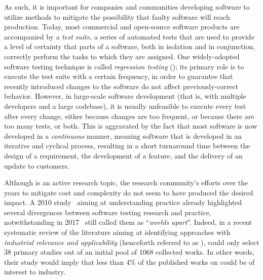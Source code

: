 As such, it is important for companies and communities developing software to utilize methods to mitigate the possibility that faulty software will reach production.
Today, most commercial and open-source software products are accompanied by a \textit{test suite}, a series of automated tests that are used to provide a level of certainty that parts of a software, both in isolation and in conjunction, correctly perform the tasks to which they are assigned.
One widely-adopted software testing technique is called \textit{regression testing} (\rt); its primary role is to execute the test suite with a certain frequency, in order to guarantee that recently introduced changes to the software do not affect previously-correct behavior.
However, in large-scale software development (that is, with multiple developers and a large codebase), it is usually unfeasible to execute every test after every change, either because changes are too frequent, or because there are too many tests, or both.
This is aggravated by the fact that most software is now developed in a \textit{continuous} manner, meaning software that is developed in an iterative and cyclical process, resulting in a short turnaround time between the design of a requirement, the development of a feature, and the delivery of an update to customers.


Although \rt is an active research topic, the research community's efforts over the years to mitigate \rt cost and complexity do not seem to have produced the desired impact.
A 2010 study~\cite{engstrom2010qualitative} aiming at understanding \rt practice already highlighted several divergences between software testing research and practice,
notwithstanding in 2017~\citet{garousi2017worlds}  
still called them as ``\textit{worlds apart}''. 
Indeed, in a recent systematic review of the \rt literature aiming at identifying approaches with \textit{industrial relevance and applicability} (henceforth referred to as \rea),
\citet{bin_ali_search_2019} could  only select 38 primary studies out of an initial pool of 1068 collected works.
In other words, their study would imply that 
less than 4\% of the published works on \rt could be of interest to industry.

